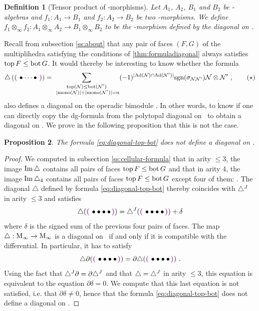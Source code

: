 \documentclass[twoside, 12pt]{amsart}
\newtheorem{definition}{Definition}[section]
\newtheorem{proposition}[definition]{Proposition}
\theoremstyle{remark}
\begin{document}
\begin{definition}[Tensor product of \Ainf -morphisms]
Let $A_1$, $A_2$, $B_1$ and $B_2$ be \Ainf -algebras and $f_1 : A_1 \rightarrow B_1$ and $f_2 : A_2 \rightarrow B_2$ be two \Ainf -morphisms. We define $f_1 \otimes_{\infty} f_2 : A_1 \otimes_\infty A_2 \rightarrow B_1 \otimes_\infty B_2$ to be the \Ainf -morphism defined by the diagonal \diagminf on \Minf .
\end{definition}

Recall from subsection \ref{ss:about} that any pair of faces $(F,G)$ of the multiplihedra satisfying the conditions of \cref{thm:formuladiagonal} always satisfies $\operatorname{top} F \leq \operatorname{bot} G$. It would thereby be interesting to know whether the formula
\begin{align*}
\triangle \left( \purple{\bullet \cdots \bullet} \right) = 
\sum_{\substack{
    \tp(\mathcal{N}) \leq \bm(\mathcal{N'}) \\
  \ |\mono(\mathcal{N})|+|\mono(\mathcal{N}')|=n
}}
(-1)^{|\mathrm{Ad}(\mathcal{N})\cap \mathrm{Ad}(\mathcal{N}')|}\mathrm{sgn}(\sigma_{\mathcal{N}\mathcal{N}'})\mathcal{N} \otimes \mathcal{N}' \ , \tag{$\star$}
\label{eq:diagonal-top-bot}
\end{align*}
also defines a diagonal on the operadic bimodule \Minf . In other words, to know if one can directly copy the dg-formula from the polytopal diagonal on \Ainf\ to obtain a diagonal on \Minf . We prove in the following proposition that this is not the case. 

\begin{proposition}
The formula \ref{eq:diagonal-top-bot} does not define a diagonal on \Minf .
\end{proposition}

\begin{proof}
We computed in subsection \ref{ss:cellular-formula} that in arity $\leq 3$, the image $\operatorname{Im} \triangle$ contains all pairs of faces $\operatorname{top} F\leq \operatorname{bot} G$ and that in arity 4, the image $\operatorname{Im} \triangle_4$ contains all pairs of faces $\operatorname{top} F\leq \operatorname{bot} G$ except four of them:  .
The diagonal $\triangle$ defined by formula \ref{eq:diagonal-top-bot} thereby coincides with $\triangle^{J}$ in arity $\leq 3$ and satisfies 
\[ \triangle ( \purple{ \bullet \bullet \bullet \bullet} ) = \diagminf ( \purple{ \bullet \bullet \bullet \bullet} ) + \delta \]
where $\delta$ is the signed sum of the previous four pairs of faces. 
The map $\triangle : \mathrm{M}_\infty \rightarrow \mathrm{M}_\infty$ is a diagonal on \Minf\ if and only if it is compatible with the differential. In particular, it has to satisfy
\[ \triangle \partial ( \purple{ \bullet \bullet \bullet \bullet} )  = \partial  \triangle (  \purple{ \bullet \bullet \bullet \bullet} )  \ . \]
Using the fact that $\triangle^{J} \partial = \partial \triangle^{J}$ and that $\triangle = \triangle^{J}$  in arity $\leq 3$, this equation is equivalent to the equation $\partial \delta = 0$. We compute that this last equation is not satisfied, i.e. that $\partial \delta \neq 0$, hence that the formula \ref{eq:diagonal-top-bot} does not define a diagonal on \Minf .
\end{proof}
\end{document}
